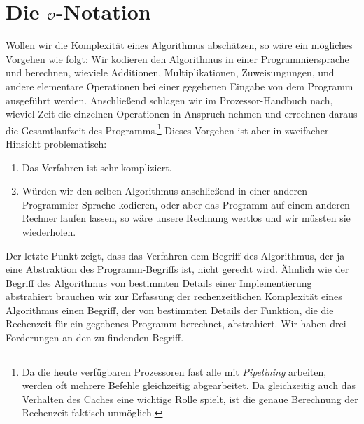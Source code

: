 \section{Die $\mathcal{O}$-Notation}
Wollen wir die Komplexit\"at eines Algorithmus absch\"atzen, so w\"are ein m\"ogliches Vorgehen
wie folgt: Wir kodieren den Algorithmus in einer Programmiersprache und berechnen,
wieviele Additionen, Multiplikationen, Zuweisungungen, und andere elementare Operationen
bei einer gegebenen Eingabe von dem Programm ausgef\"uhrt werden. Anschlie{\ss}end schlagen wir
im Prozessor-Handbuch nach, wieviel Zeit die einzelnen Operationen in Anspruch nehmen und
errechnen daraus die Gesamtlaufzeit des Programms.\footnote{
Da die heute verf\"ugbaren Prozessoren fast alle mit \emph{Pipelining} arbeiten, werden oft
mehrere Befehle gleichzeitig abgearbeitet. Da gleichzeitig auch das Verhalten des Caches
eine wichtige Rolle spielt, ist die genaue Berechnung der Rechenzeit faktisch unm\"oglich.}
Dieses Vorgehen ist aber in zweifacher Hinsicht problematisch:
\begin{enumerate}
\item Das Verfahren ist sehr kompliziert.
\item W\"urden wir den selben Algorithmus anschlie{\ss}end in einer anderen Programmier-Sprache
      kodieren, oder aber das Programm auf einem anderen Rechner laufen lassen, so w\"are
      unsere Rechnung wertlos und wir m\"ussten sie wiederholen.
\end{enumerate}
Der letzte Punkt zeigt, dass das Verfahren dem Begriff des Algorithmus, der ja eine
Abstraktion des Programm-Begriffs ist, nicht gerecht wird.  \"Ahnlich wie der Begriff des
Algorithmus von bestimmten Details einer Implementierung abstrahiert brauchen wir zur
Erfassung der rechenzeitlichen Komplexit\"at eines Algorithmus einen Begriff, der von
bestimmten Details der Funktion, die die Rechenzeit f\"ur ein gegebenes Programm berechnet,
abstrahiert.  Wir haben drei Forderungen an den zu findenden  Begriff.
